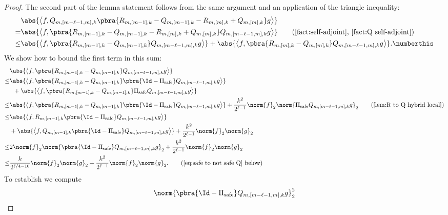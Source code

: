 \begin{proof}
    The second part of the lemma statement follows from the same argument and an application of the triangle inequality:
    \begin{align*}
        &\abs{\left\langle f,Q_{m,[m-\ell-1,m],k}\pbra{R_{m,[m-1],k}-Q_{m,[m-1],k}-R_{m,[m],k}+Q_{m,[m],k}}g\right\rangle}\\
        =&\abs{\left\langle f,\pbra{R_{m,[m-1],k}-Q_{m,[m-1],k}-R_{m,[m],k}+Q_{m,[m],k}}Q_{m,[m-\ell-1,m],k}g\right\rangle}\tag{\Cref{fact:self-adjoint}, \Cref{fact:Q self-adjoint}}\\
        \leq&\abs{\left\langle f,\pbra{R_{m,[m-1],k}-Q_{m,[m-1],k}}Q_{m,[m-\ell-1,m],k}g\right\rangle}+\abs{\left\langle f,\pbra{R_{m,[m],k}-Q_{m,[m],k}}Q_{m,[m-\ell-1,m],k}g\right\rangle}.\numberthis\label{eq:hybrid the difference}
    \end{align*}
    We show how to bound the first term in this sum:
    \begin{align*}
        &\abs{\left\langle f,\pbra{R_{m,[m-1],k}-Q_{m,[m-1],k}}Q_{m,[m-\ell-1,m],k}g\right\rangle}\\
        \leq&\abs{\left\langle f,\pbra{R_{m,[m-1],k}-Q_{m,[m-1],k}}\pbra{\Id-\Pi_{\mathrm{safe}}}Q_{m,[m-\ell-1,m],k}g\right\rangle }\\
        &\;\;+\abs{\left\langle f,\pbra{R_{m,[m-1],k}-Q_{m,[m-1],k}}\Pi_{\mathrm{safe}}Q_{m,[m-\ell-1,m],k}g\right\rangle}\\
        \leq&\abs{\left\langle f,\pbra{R_{m,[m-1],k}-Q_{m,[m-1],k}}\pbra{\Id-\Pi_{\mathrm{safe}}}Q_{m,[m-\ell-1,m],k}g\right\rangle }+\frac{k^2}{2^{\ell-1}}\norm{f}_2\norm{\Pi_{\mathrm{safe}}Q_{m,[m-\ell-1,m],k}g}_2\tag{\Cref{lem:R to Q hybrid local}}\\
        \leq&\abs{\left\langle f,R_{m,[m-1],k}\pbra{\Id-\Pi_{\mathrm{safe}}}Q_{m,[m-\ell-1,m],k}g\right\rangle }\\
        &+\abs{\left\langle f,Q_{m,[m-1],k}\pbra{\Id-\Pi_{\mathrm{safe}}}Q_{m,[m-\ell-1,m],k}g\right\rangle }+\frac{k^2}{2^{\ell-1}}\norm{f}_2\norm{g}_2\\
        \leq&2\norm{f}_2\norm{\pbra{\Id-\Pi_{\mathrm{safe}}}Q_{m,[m-\ell-1,m],k}g}_2+\frac{k^2}{2^{\ell-1}}\norm{f}_2\norm{g}_2\\
        \leq&\frac{k}{2^{\ell/4-10}}\norm{f}_2\norm{g}_2+\frac{k^2}{2^{\ell-1}}\norm{f}_2\norm{g}_2.\tag{\Cref{eq:safe to not safe Q} below}
    \end{align*}
    To establish  we compute 
    \begin{align*}
        &\norm{\pbra{\Id-\Pi_{\mathrm{safe}}}Q_{m,[m-\ell-1,m],k}g}_2^2\\

\end{align*}
\end{proof}
